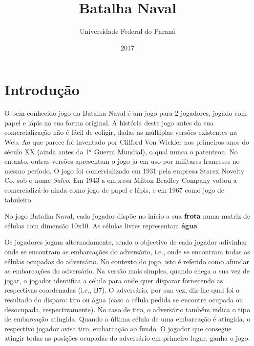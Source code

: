 \documentclass[defesa,oneside]{ppginf}
\begin{document}
\title{Batalha Naval}

\author{Universidade Federal do Paraná}

\date{2017}



\frontmatter
\pagestyle{frontmatter}
\titlepage
\tableofcontents


\mainmatter
\pagestyle{mainmatter}


\chapter{Introdução}

O bem conhecido jogo da Batalha Naval é um jogo para 2 jogadores, jogado com papel e lápis na sua forma original. A história deste jogo antes da sua comercialização não é fácil de coligir, dadas as múltiplas versões existentes na Web. Ao que parece foi inventado por Clifford Von Wickler nos primeiros anos do século XX (ainda antes da 1$^a$ Guerra Mundial), o qual nunca o patenteou. No entanto, outras versões apresentam o jogo já em uso por militares franceses no mesmo período. O jogo foi comercializado em 1931 pela empresa Starex Novelty Co. sob o nome \textit{Salvo}. Em 1943 a empresa Milton Bradley Company voltou a comercializá-lo ainda como jogo de papel e lápis, e em 1967 como jogo de tabuleiro.

No jogo Batalha Naval, cada jogador dispõe no início a sua \textbf{frota} numa matriz de células com dimensão 10x10. As células livres representam \textbf{água}.

Os jogadores jogam alternadamente, sendo o objectivo de cada jogador adivinhar onde se encontram as embarcações do adversário, i.e., onde se encontram todas as células ocupadas do adversário. No contexto do jogo, isto é referido como afundar as embarcações do adversário. Na versão mais simples, quando chega a sua vez de jogar, o jogador identifica a célula para onde quer disparar fornecendo as respectivas coordenadas (i.e., B7). O adversário, por sua vez, diz-lhe qual foi o resultado do disparo: tiro ou água (caso a célula pedida se encontre ocupada ou desocupada, respectivamente). No caso de tiro, o adversário também indica o tipo de embarcação atingida. Quando a última célula de uma embarcação é atingida, o respectivo jogador avisa tiro, embarcação ao fundo. O jogador que consegue atingir todas as posições ocupadas do adversário em primeiro lugar, ganha o jogo.
\end{document}
